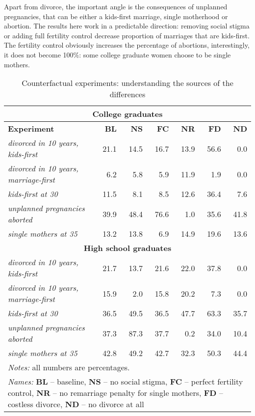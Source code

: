 \documentclass[12pt,letter]{article}
\begin{document}
Apart from divorce, the important angle is the consequences of unplanned pregnancies, that can be either a kids-first marriage, single motherhood or abortion. The results here work in a predictable direction: removing social stigma or adding full fertility control decrease proportion of marriages that are kids-first. The fertility control obviously increases the percentage of abortions, interestingly, it does not become 100\%: some college graduate women choose to be single mothers. 



\begin{table}[h]
\caption{Counterfactual experiments: understanding the sources of the differences\label{diff-sources}}
\begin{center}
\begin{tabular}{l r r r r r r}\hline\hline
\multicolumn{7}{c}{\textbf{College graduates}}\\\hline
\textbf{Experiment} & \textbf{BL} & \textbf{NS} & \textbf{FC} & \textbf{NR} & \textbf{FD} & \textbf{ND} \\
\textit{divorced in 10 years, kids-first} & 21.1 & 14.5 & 16.7 & 13.9 & 56.6 & 0.0 \\
\textit{divorced in 10 years, marriage-first} & 6.2 & 5.8 & 5.9 & 11.9 & 1.9 & 0.0 \\
\textit{kids-first at 30} & 11.5 & 8.1 & 8.5 & 12.6 & 36.4 & 7.6 \\
\textit{unplanned pregnancies aborted} & 39.9 & 48.4 & 76.6 & 1.0 & 35.6 & 41.8 \\
\textit{single mothers at 35} & 13.2 & 13.8 & 6.9 & 14.9 & 19.6 & 13.6 \\\hline
\multicolumn{7}{c}{\textbf{High school graduates}}\\\hline
\textit{divorced in 10 years, kids-first} & 21.7 & 13.7 & 21.6 & 22.0 & 37.8 & 0.0 \\
\textit{divorced in 10 years, marriage-first} & 15.9 & 2.0 & 15.8 & 20.2 & 7.3 & 0.0 \\
\textit{kids-first at 30} & 36.5 & 49.5 & 36.5 & 47.7 & 63.3 & 35.7 \\
\textit{unplanned pregnancies aborted} & 37.3 & 87.3 & 37.7 & 0.2 & 34.0 & 10.4 \\
\textit{single mothers at 35} & 42.8 & 49.2 & 42.7 & 32.3 & 50.3 & 44.4 \\\hline
\multicolumn{7}{l}{{\footnotesize \textit{Notes:} all numbers are percentages.}}\\\hline
\multicolumn{7}{p{0.8\linewidth}}{{\footnotesize \textit{Names:} \textbf{BL} -- baseline, \textbf{NS} -- no social stigma, \textbf{FC} -- perfect fertility control, \textbf{NR} -- no remarriage penalty for single mothers, 
 \textbf{FD} -- costless divorce, \textbf{ND} -- no divorce at all
 }}\\\hline
\end{tabular}
\end{center}
\end{table}
\end{document}
